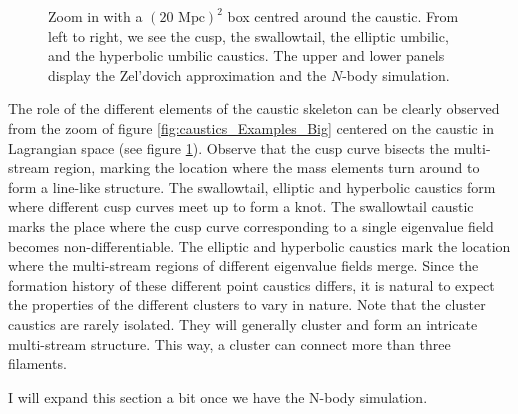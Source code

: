 \documentclass[a4paper, 11pt]{article}
\begin{document}
\begin{figure}
\begin{subfigure}[b]{0.24\textwidth}
\end{subfigure}
\caption{Zoom in with a $(20 \text{ Mpc})^2$ box centred around the caustic. From left to right, we see the cusp, the swallowtail, the elliptic umbilic, and the hyperbolic umbilic caustics. The upper and lower panels display the Zel'dovich approximation and the $N$-body simulation.}\label{fig:caustics_Examples_Small}
\end{figure}

The role of the different elements of the caustic skeleton can be clearly observed from the zoom of figure \ref{fig:caustics_Examples_Big} centered on the caustic in Lagrangian space (see figure \ref{fig:caustics_Examples_Small}). Observe that the cusp curve bisects the multi-stream region, marking the location where the mass elements turn around to form a line-like structure. The swallowtail, elliptic and hyperbolic caustics form where different cusp curves meet up to form a knot. The swallowtail caustic marks the place where the cusp curve corresponding to a single eigenvalue field becomes non-differentiable. The elliptic and hyperbolic caustics mark the location where the multi-stream regions of different eigenvalue fields merge. Since the formation history of these different point caustics differs, it is natural to expect the properties of the different clusters to vary in nature. Note that the cluster caustics are rarely isolated. They will generally cluster and form an intricate multi-stream structure. This way, a cluster can connect more than three filaments.

\begin{framed}
{\color{red} I will expand this section a bit once we have the N-body simulation.}
\end{framed}





\end{document}
